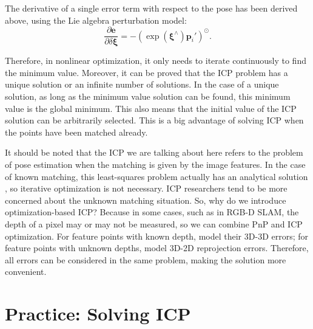 The derivative of a single error term with respect to the pose has been derived above, using the Lie algebra perturbation model:
\begin{equation}
\frac{{\partial \mathbf{e}}}{{\partial \delta \boldsymbol{\xi} }} =  - {\left( {\exp \left( {{ \boldsymbol{\xi} ^ \wedge }} \right){{\mathbf{p}}_i}'} \right)^ \odot }.
\end{equation}

Therefore, in nonlinear optimization, it only needs to iterate continuously to find the minimum value. Moreover, it can be proved that  {\cite{Barfoot2016}} the ICP problem has a unique solution or an infinite number of solutions. In the case of a unique solution, as long as the minimum value solution can be found, this minimum value is the global minimum. This also means that the initial value of the ICP solution can be arbitrarily selected. This is a big advantage of solving ICP when the points have been matched already.

It should be noted that the ICP we are talking about here refers to the problem of pose estimation when the matching is given by the image features. In the case of known matching, this least-squares problem actually has an analytical solution  {\cite{Faugeras1986, Horn1987, Sharp2002}}, so iterative optimization is not necessary. ICP researchers tend to be more concerned about the unknown matching situation. So, why do we introduce optimization-based ICP? Because in some cases, such as in RGB-D SLAM, the depth of a pixel may or may not be measured, so we can combine PnP and ICP optimization. For feature points with known depth, model their 3D-3D errors; for feature points with unknown depths, model 3D-2D reprojection errors. Therefore, all errors can be considered in the same problem, making the solution more convenient.

\section{Practice: Solving ICP}
